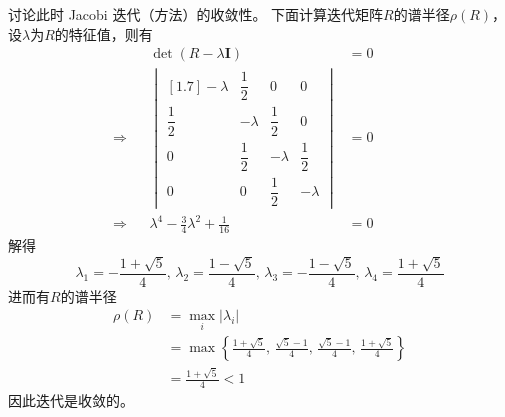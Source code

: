 \documentclass[11pt]{article}
\begin{document}
\begin{question}
\begin{subquestion}{讨论此时 Jacobi 迭代（方法）的收敛性。}
{            下面计算迭代矩阵$R$的谱半径$\rho(R)$，设$\lambda$为$R$的特征值，则有
            \begin{align*}
                            &  & \det{(R - \lambda \mathbf{I})}               & = 0 &  &  & \\
                \Rightarrow &  & \begin{vmatrix}[1.7]
                    -\lambda     & \dfrac{1}{2} & 0            & 0            \\
                    \dfrac{1}{2} & -\lambda     & \dfrac{1}{2} & 0            \\
                    0            & \dfrac{1}{2} & -\lambda     & \dfrac{1}{2} \\
                    0            & 0            & \dfrac{1}{2} & -\lambda
                \end{vmatrix}                    & = 0 &  &  & \\
                \Rightarrow &  & \lambda ^4-\frac{3}{4}\lambda^2+\frac{1}{16} & = 0 &  &  &
            \end{align*}
            解得
            \begin{equation*}
                \lambda_1 = - \frac{1 + \sqrt{5}}{4},\, \lambda_2 = \frac{1 - \sqrt{5}}{4},\, \lambda_3 = - \frac{1 - \sqrt{5}}{4},\, \lambda_4 = \frac{1 + \sqrt{5}}{4}
            \end{equation*}
            进而有$R$的谱半径
            \begin{align*}
                \rho(R) & = \max_i{\left|\lambda_i\right|}                                                                                           \\
                        & = \max{\left\{\frac{1 + \sqrt{5}}{4},\, \frac{\sqrt{5} - 1}{4},\, \frac{\sqrt{5} - 1}{4},\,\frac{1 + \sqrt{5}}{4}\right\}} \\
                        & = \frac{1 + \sqrt{5}}{4} < 1
            \end{align*}
            因此迭代是收敛的。
        }
    \end{subquestion}

\end{question}
\end{document}
